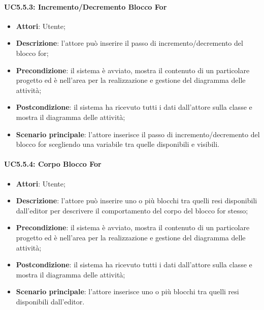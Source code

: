 \paragraph{UC5.5.3: Incremento/Decremento Blocco For}
\label{UC5.5.3}
\begin{itemize}
	\item \textbf{Attori}: Utente;
	\item \textbf{Descrizione}: l'attore può inserire il passo di incremento/decremento del blocco for;
	\item \textbf{Precondizione}: il sistema è avviato, mostra il contenuto di un particolare progetto ed è nell'area per la realizzazione e gestione del diagramma delle attività;
	\item \textbf{Postcondizione}: il sistema ha ricevuto tutti i dati dall'attore sulla classe e mostra il diagramma delle attività;
	\item \textbf{Scenario principale}: l'attore inserisce il passo di incremento/decremento del blocco for scegliendo una variabile tra quelle disponibili e visibili.
\end{itemize}

\paragraph{UC5.5.4: Corpo Blocco For}
\label{UC5.5.4}
\begin{itemize}
	\item \textbf{Attori}: Utente;
	\item \textbf{Descrizione}: l'attore può inserire uno o più blocchi tra quelli resi disponibili dall'editor per descrivere il comportamento del corpo del blocco for stesso;
	\item \textbf{Precondizione}: il sistema è avviato, mostra il contenuto di un particolare progetto ed è nell'area per la realizzazione e gestione del diagramma delle attività;
	\item \textbf{Postcondizione}: il sistema ha ricevuto tutti i dati dall'attore sulla classe e mostra il diagramma delle attività;
	\item \textbf{Scenario principale}: l'attore inserisce uno o più blocchi tra quelli resi disponibili dall'editor.
\end{itemize}

